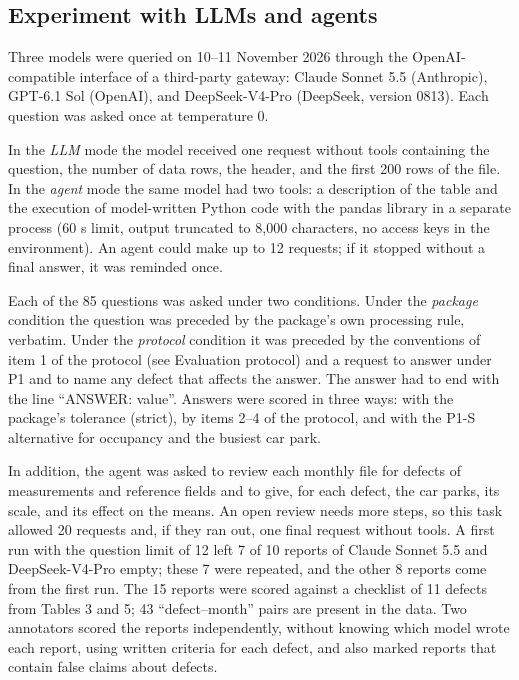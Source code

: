 \documentclass[default]{subfiles}
\begin{document}
{\subsection{Experiment with LLMs and agents}

Three models were queried on 10--11 November 2026 through the OpenAI-compatible interface of a third-party gateway: Claude Sonnet 5.5 (Anthropic), GPT-6.1 Sol (OpenAI), and DeepSeek-V4-Pro (DeepSeek, version 0813). Each question was asked once at temperature 0.

In the \emph{LLM} mode the model received one request without tools containing the question, the number of data rows, the header, and the first 200 rows of the file. In the \emph{agent} mode the same model had two tools: a description of the table and the execution of model-written Python code with the pandas library in a separate process (60 s limit, output truncated to 8,000 characters, no access keys in the environment). An agent could make up to 12 requests; if it stopped without a final answer, it was reminded once.

Each of the 85 questions was asked under two conditions. Under the \emph{package} condition the question was preceded by the package's own processing rule, verbatim. Under the \emph{protocol} condition it was preceded by the conventions of item 1 of the protocol (see Evaluation protocol) and a request to answer under P1 and to name any defect that affects the answer. The answer had to end with the line ``ANSWER: value''. Answers were scored in three ways: with the package's tolerance (strict), by items 2--4 of the protocol, and with the P1-S alternative for occupancy and the busiest car park.

In addition, the agent was asked to review each monthly file for defects of measurements and reference fields and to give, for each defect, the car parks, its scale, and its effect on the means. An open review needs more steps, so this task allowed 20 requests and, if they ran out, one final request without tools. A first run with the question limit of 12 left 7 of 10 reports of Claude Sonnet 5.5 and DeepSeek-V4-Pro empty; these 7 were repeated, and the other 8 reports come from the first run. The 15 reports were scored against a checklist of 11 defects from Tables 3 and 5; 43 ``defect--month'' pairs are present in the data. Two annotators scored the reports independently, without knowing which model wrote each report, using written criteria for each defect, and also marked reports that contain false claims about defects.

}
\end{document}
